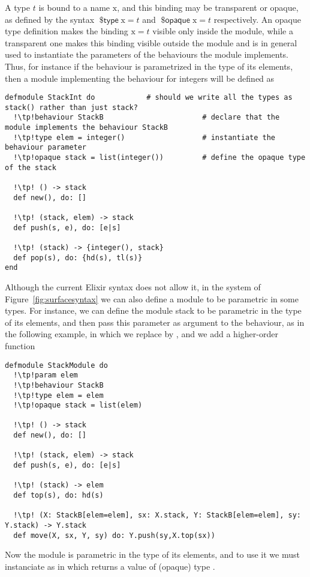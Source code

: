 \documentclass[a4paper,10pt]{article}
\DeclareMathOperator{\kwopq}{\textsf{\$opaque}}
\DeclareMathOperator{\kwtp}{\textsf{\$type}}
\newcommand{\tx}{\textrm{x}}
\begin{document}
A type $t$ is bound to a name $\tx$, and this binding may be transparent or opaque, as defined by the syntax $\kwtp \tx = t$ and $\kwopq \tx =t$ respectively. An opaque type definition makes the binding $\tx= t$ visible only inside the module, while a transparent one makes this binding visible outside the module and is in general used to instantiate the parameters of the behaviours the module implements. Thus, for instance if the  behaviour is parametrized in the type  of its elements, then a module  implementing the behaviour for integers will be defined as
\begin{verbatim}
defmodule StackInt do            # should we write all the types as stack() rather than just stack?
  !\tp!behaviour StackB                       # declare that the module implements the behaviour StackB 
  !\tp!type elem = integer()                  # instantiate the behaviour parameter
  !\tp!opaque stack = list(integer())         # define the opaque type of the stack

  !\tp! () -> stack
  def new(), do: []

  !\tp! (stack, elem) -> stack
  def push(s, e), do: [e|s] 

  !\tp! (stack) -> {integer(), stack}
  def pop(s), do: {hd(s), tl(s)} 
end
\end{verbatim}
Although the current Elixir syntax does not allow it, in the system of Figure~\ref{fig:surfacesyntax} we can also define a module to be parametric in some types. For instance, we can define the module stack to be parametric in the type of
its elements, and then pass this parameter as argument to the behaviour, as in
the following example, in which we replace  by , and we add a
higher-order function
\begin{verbatim}
defmodule StackModule do
  !\tp!param elem
  !\tp!behaviour StackB
  !\tp!type elem = elem
  !\tp!opaque stack = list(elem)

  !\tp! () -> stack
  def new(), do: []

  !\tp! (stack, elem) -> stack
  def push(s, e), do: [e|s] 

  !\tp! (stack) -> elem
  def top(s), do: hd(s)

  !\tp! (X: StackB[elem=elem], sx: X.stack, Y: StackB[elem=elem], sy: Y.stack) -> Y.stack
  def move(X, sx, Y, sy) do: Y.push(sy,X.top(sx))
\end{verbatim}
Now the module  is parametric in the type of its elements, and to use it we must instanciate as in  which returns a value of (opaque) type .
\end{document}

